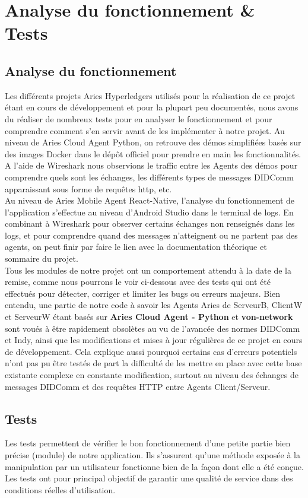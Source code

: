 \documentclass[12pt, openany]{report}
\begin{document}
\section{Analyse du fonctionnement \& Tests}
\noindent 
\begin{flushleft}

\subsection{Analyse du fonctionnement}
Les différents projets Aries Hyperledgers utilisés pour la réalisation de ce projet étant en cours de développement et pour la plupart peu documentés, nous avons du réaliser de nombreux tests pour en analyser le fonctionnement et pour comprendre comment s'en servir avant de les implémenter à notre projet. Au niveau de Aries Cloud Agent Python, on retrouve des démos simplifiées basés sur des images Docker dans le dépôt officiel pour prendre en main les fonctionnalités. A l'aide de Wireshark nous observions le traffic entre les Agents des démos pour comprendre quels sont les échanges, les différents types de messages DIDComm apparaissant sous forme de requêtes http, etc.\\
Au niveau de Aries Mobile Agent React-Native, l'analyse du fonctionnement de l'application s'effectue au niveau d'Android Studio dans le terminal de logs. En combinant à Wireshark pour observer certains échanges non renseignés dans les logs, et pour comprendre quand des messages n'atteignent ou ne partent pas des agents, on peut finir par faire le lien avec la documentation théorique et sommaire du projet.\\
Tous les modules de notre projet ont un comportement attendu à la date de la remise, comme nous pourrons le voir ci-dessous avec des tests qui ont été effectués pour détecter, corriger et limiter les bugs ou erreurs majeurs.
Bien entendu, une partie de notre code à savoir les Agents Aries de ServeurB, ClientW et ServeurW étant basés sur \textbf{Aries Cloud Agent - Python} et \textbf{von-network} sont voués à être rapidement obsolètes au vu de l'avancée des normes DIDComm et Indy, ainsi que les modifications et mises à jour régulières de ce projet en cours de développement. Cela explique aussi pourquoi certains cas d'erreurs potentiels n'ont pas pu être testés de part la difficulté de les mettre en place avec cette base existante complexe en constante modification, surtout au niveau des échanges de messages DIDComm et des requêtes HTTP entre Agents Client/Serveur.
\subsection{Tests}
Les tests permettent de vérifier le bon fonctionnement d’une petite partie bien précise (module) de notre application. Ils s'assurent qu'une méthode exposée à la manipulation par un utilisateur fonctionne bien de la façon dont elle a été conçue.
Les tests ont pour principal objectif de garantir une qualité de service dans des conditions réelles d'utilisation.

\end{flushleft}
\end{document}
